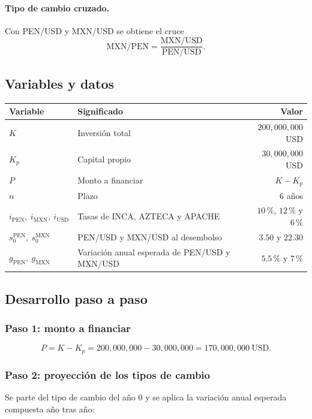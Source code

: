 \documentclass[11pt]{article}
\newcommand{\pc}{\text{\%}}
\begin{document}
\paragraph{Tipo de cambio cruzado.} Con PEN/USD y MXN/USD se obtiene el cruce
\[
\text{MXN/PEN}=\frac{\text{MXN/USD}}{\text{PEN/USD}} .
\]

\subsection{Variables y datos}

\begin{center}
\begin{tabular}{l l r}\toprule
Variable & Significado & Valor\\\midrule
$K$ & Inversi\'on total & $200{,}000{,}000$ USD\\
$K_p$ & Capital propio & $30{,}000{,}000$ USD\\
$P$ & Monto a financiar & $K-K_p$\\
$n$ & Plazo & $6$ a\~nos\\
$i_{\text{PEN}},\ i_{\text{MXN}},\ i_{\text{USD}}$ & Tasas de INCA, AZTECA y APACHE & $10\,\pc$, $12\,\pc$ y $6\,\pc$\\
$s^{\text{PEN}}_0,\ s^{\text{MXN}}_0$ & PEN/USD y MXN/USD al desembolso & $3.50$ y $22.30$\\
$g_{\text{PEN}},\ g_{\text{MXN}}$ & Variaci\'on anual esperada de PEN/USD y MXN/USD & $5.5\,\pc$ y $7\,\pc$\\\bottomrule
\end{tabular}
\end{center}

\subsection{Desarrollo paso a paso}

\subsubsection*{Paso 1: monto a financiar}

\[
P=K-K_p=200{,}000{,}000-30{,}000{,}000=170{,}000{,}000\ \text{USD.}
\]

\subsubsection*{Paso 2: proyecci\'on de los tipos de cambio}

Se parte del tipo de cambio del a\~no 0 y se aplica la variaci\'on anual esperada compuesta a\~no tras a\~no:
\end{document}
